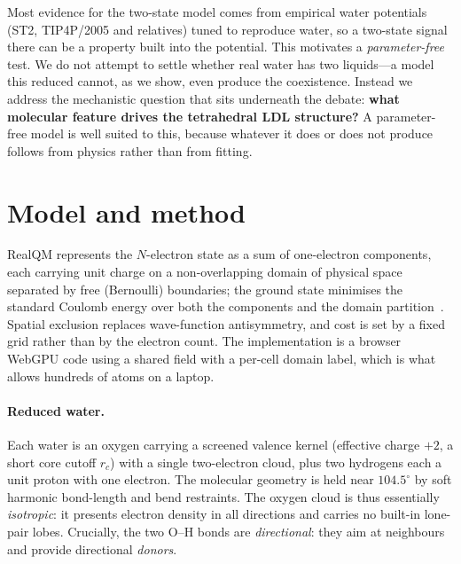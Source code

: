 \documentclass[11pt]{article}
\begin{document}
Most evidence for the two-state model comes from empirical water potentials (ST2,
TIP4P/2005 and relatives) tuned to reproduce water, so a two-state signal there can be a
property built into the potential. This motivates a \emph{parameter-free} test. We do not
attempt to settle whether real water has two liquids---a model this reduced cannot, as we
show, even produce the coexistence. Instead we address the mechanistic question that sits
underneath the debate: \textbf{what molecular feature drives the tetrahedral LDL
structure?} A parameter-free model is well suited to this, because whatever it does or does
not produce follows from physics rather than from fitting.

\section{Model and method}

RealQM represents the $N$-electron state as a sum of one-electron components, each carrying
unit charge on a non-overlapping domain of physical space separated by free (Bernoulli)
boundaries; the ground state minimises the standard Coulomb energy over both the components
and the domain partition~\cite{realqm}. Spatial exclusion replaces wave-function
antisymmetry, and cost is set by a fixed grid rather than by the electron count. The
implementation is a browser WebGPU code using a shared field with a per-cell domain label,
which is what allows hundreds of atoms on a laptop.

\paragraph{Reduced water.} Each water is an oxygen carrying a screened valence kernel
(effective charge $+2$, a short core cutoff $r_c$) with a single two-electron cloud, plus
two hydrogens each a unit proton with one electron. The molecular geometry is held near
$104.5^\circ$ by soft harmonic bond-length and bend restraints. The oxygen cloud is thus
essentially \emph{isotropic}: it presents electron density in all directions and carries no
built-in lone-pair lobes. Crucially, the two O--H bonds are \emph{directional}: they aim at
neighbours and provide directional \emph{donors}.
\end{document}
